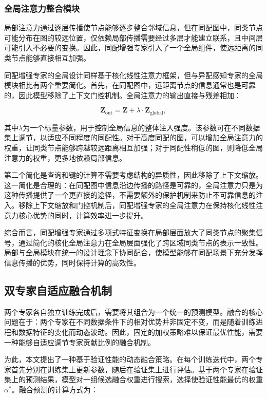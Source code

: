 \documentclass[a4paper,10pt]{article}
\begin{document}
\subsubsection{全局注意力整合模块}

局部注意力通过逐层传播使节点能够逐步整合邻域信息，但在同配图中，同类节点可能分布在图的较远位置，仅依赖局部传播需要经过多层才能建立联系，且中间层可能引入不必要的变换。因此，同配增强专家引入了一个全局组件，使远距离的同类节点能够直接相互加强。

同配增强专家的全局设计同样基于核化线性注意力框架，但与异配感知专家的全局模块相比有两个重要简化。首先，在同配图中，远距离节点的信息通常也是可靠的，因此模型移除了上下文门控机制。全局注意力的输出直接与残差相加：

\begin{equation}
\mathbf{Z}_{\text{out}} = \mathbf{Z} + \lambda \cdot \mathbf{Z}_{\text{global}},
\end{equation}

其中$\lambda$为一个标量参数，用于控制全局信息的整体注入强度。该参数可在不同数据集上调节，以适应不同程度的同配性。对于高度同配的图，可以增加全局注意力的权重，让同类节点能够跨越较远距离相互加强；对于同配性稍低的图，则降低全局注意力的权重，更多地依赖局部信息。

第二个简化是查询和键的计算不需要考虑结构的异质性，因此移除了上下文缩放。这一简化是合理的：在同配图中信息沿边传播的路径是可靠的，全局注意力只是为这种传播提供了一个更直接的途径，不需要额外的保护机制来防止不可靠信息的注入。移除上下文缩放和门控机制后，同配增强专家的全局注意力在保持核化线性注意力核心优势的同时，计算效率进一步提升。

综合而言，同配增强专家通过多项式特征变换在局部层面放大了同类节点的聚集信号，通过简化的核化全局注意力在全局层面强化了跨区域同类节点的表示一致性。局部与全局模块在统一的设计理念下协同配合，使模型能够在同配场景下充分发挥信息传播的优势，同时保持计算的高效性。

\subsection{双专家自适应融合机制}

两个专家各自独立训练完成后，需要将其组合为一个统一的预测模型。融合的核心问题在于：两个专家在不同数据条件下的相对优势并非固定不变，而是随着训练进程和数据特征的变化而动态波动。因此，固定的加权策略难以保证最优性能，需要一种能够自适应调节专家贡献比例的融合机制。

为此，本文提出了一种基于验证性能的动态融合策略。在每个训练迭代中，两个专家首先分别在训练集上更新参数，随后在验证集上进行评估。基于两个专家在验证集上的预测结果，模型对一组候选融合权重进行搜索，选择使验证性能最优的权重$\alpha^*$。融合预测的计算方式为：
\end{document}
